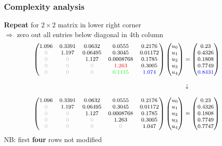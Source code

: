 \documentclass{beamer}
\begin{document}
\begin{frame}[fragile]
  \frametitle{Complexity analysis}
  \textbf{Repeat} for $2\times 2$ matrix in lower right corner\\
  $\Rightarrow$ zero out all entries below diagonal in 4th column
  $$
  {\footnotesize
\begin{aligned}
    \begin{pmatrix}
1.096 & 0.3391 & 0.0632 & 0.0555 & 0.2176\\
\textcolor{lightgray}{0} & 1.197 & 0.06495 & 0.3045 & 0.01172\\
\textcolor{lightgray}{0} & \textcolor{lightgray}{0} & 1.127 & 0.0008768 & 0.1785\\
\textcolor{lightgray}{0} & \textcolor{lightgray}{0} & \textcolor{lightgray}{0} & \textcolor{red}{1.263} & \textcolor{black}{0.3005}\\
\textcolor{lightgray}{0} & \textcolor{lightgray}{0} & \textcolor{lightgray}{0} & \textcolor{green}{0.1115} & \textcolor{blue}{1.074}
\end{pmatrix}
\begin{pmatrix}
u_0 \\ u_1 \\ u_2 \\ u_3 \\ u_4
\end{pmatrix}
&=
\begin{pmatrix}
0.23\\
0.4326\\
0.1808\\
\textcolor{black}{0.7749}\\
\textcolor{blue}{0.8431}
\end{pmatrix}\\[2ex]
&\downarrow\\[2ex]
\begin{pmatrix}
1.096 & 0.3391 & 0.0632 & 0.0555 & 0.2176\\
\textcolor{lightgray}{0} & 1.197 & 0.06495 & 0.3045 & 0.01172\\
\textcolor{lightgray}{0} & \textcolor{lightgray}{0} & 1.127 & 0.0008768 & 0.1785\\
\textcolor{lightgray}{0} & \textcolor{lightgray}{0} & \textcolor{lightgray}{0} & 1.263 & 0.3005\\
\textcolor{lightgray}{0} & \textcolor{lightgray}{0} & \textcolor{lightgray}{0} & \textcolor{lightgray}{0} & 1.047
\end{pmatrix}
\begin{pmatrix}
u_0 \\ u_1 \\ u_2 \\ u_3 \\ u_4
\end{pmatrix}
&=
\begin{pmatrix}
0.23\\
0.4326\\
0.1808\\
0.7749\\
0.7747
\end{pmatrix}
\end{aligned}}
$$
NB: first \textbf{four} rows not modified
\end{frame}
\end{document}

